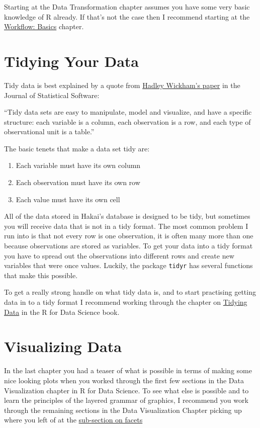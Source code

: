 \documentclass[]{book}
\providecommand{\tightlist}{%
  \setlength{\itemsep}{0pt}\setlength{\parskip}{0pt}}
\begin{document}
Starting at the Data Transformation chapter assumes you have some very
basic knowledge of R already. If that's not the case then I recommend
starting at the
\href{http://r4ds.had.co.nz/workflow-basics.html}{Workflow: Basics}
chapter.

\section{Tidying Your Data}\label{tidying-your-data}

Tidy data is best explained by a quote from
\href{http://www.jstatsoft.org/v59/i10/paper}{Hadley Wickham's paper} in
the Journal of Statistical Software:

``Tidy data sets are easy to manipulate, model and visualize, and have a
specific structure: each variable is a column, each observation is a
row, and each type of observational unit is a table.''

The basic tenets that make a data set tidy are:

\begin{enumerate}
\def\labelenumi{\arabic{enumi}.}
\tightlist
\item
  Each variable must have its own column
\item
  Each observation must have its own row
\item
  Each value must have its own cell
\end{enumerate}

All of the data stored in Hakai's database is designed to be tidy, but
sometimes you will receive data that is not in a tidy format. The most
common problem I run into is that not every row is one observation, it
is often many more than one because observations are stored as
variables. To get your data into a tidy format you have to spread out
the observations into different rows and create new variables that were
once values. Luckily, the package \texttt{tidyr} has several functions
that make this possible.

To get a really strong handle on what tidy data is, and to start
practising getting data in to a tidy format I recommend working through
the chapter on \href{http://r4ds.had.co.nz/tidy-data.html}{Tidying Data}
in the R for Data Science book.

\section{Visualizing Data}\label{visualizing-data}

In the last chapter you had a teaser of what is possible in terms of
making some nice looking plots when you worked through the first few
sections in the Data Visualization chapter in R for Data Science. To see
what else is possible and to learn the principles of the layered grammar
of graphics, I recommend you work through the remaining sections in the
Data Visualization Chapter picking up where you left of at the
\href{http://r4ds.had.co.nz/data-visualisation.html\#facets}{sub-section
on facets}
\end{document}
